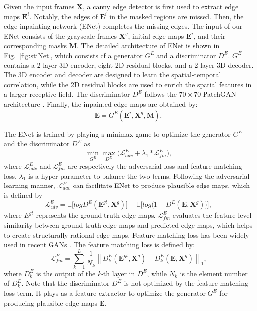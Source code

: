 Given the input frames $\boldsymbol{X}$, a canny edge detector is first used to extract edge maps $\boldsymbol{E}^{i}$. Notably, the edges of $\boldsymbol{E}^{i}$ in the masked regions are missed. 
Then, the edge inpainting network (ENet) completes the missing edges.
The input of our ENet consists of the grayscale frames $\boldsymbol{X}^{g}$, initial edge maps $\boldsymbol{E}^{i}$, and their corresponding masks $\boldsymbol{M}$.
%
The detailed architecture of ENet is shown in Fig.~\ref{fig:stiNet}, which consists of a generator $G^E$ and a discriminator $D^E$.
$G^E$ contains a 2-layer 3D encoder, eight 2D residual blocks, and a 2-layer 3D decoder. 
The 3D encoder and decoder are designed to learn the spatial-temporal correlation, while the 2D residual blocks are used to enrich the spatial features in a larger receptive field. The discriminator $D^E$ follows the $70\times 70$ PatchGAN architecture \cite{Isola_2017_CVPR}. 
Finally, the inpainted edge maps are obtained by:
\begin{equation}
\label{eq:edgenet}
\boldsymbol{E}=G^E(\boldsymbol{E}^{i},\boldsymbol{X}^{g},\boldsymbol{M}),
\end{equation}

The ENet is trained by playing a minimax game to optimize the generator $G^E$ and the discriminator $D^E$ as
\begin{equation}
\label{eq:loss_e}
\min\limits_{G^E} \max \limits_{D^E} \big(\mathcal{L}^E_{adv}+\lambda_1 * \mathcal{L}^E_{fm}\big),
\end{equation}
where $\mathcal{L}^E_{adv}$ and $\mathcal{L}^E_{fm}$ are respectively the adversarial loss and feature matching loss. 
$\lambda_1$ is a hyper-parameter to balance the two terms.
%
Following the adversarial learning manner, $\mathcal{L}^E_{adv}$ can facilitate ENet to produce plausible edge maps, which is defined by
\begin{equation} \label{eq:edge_adver}
\mathcal{L}^E_{adv}  =\mathbb{E}\big[logD^E(\boldsymbol{E}^{gt},\boldsymbol{X}^{g})\big] +\mathbb{E} \big[log\big(1-D^E ( \boldsymbol{E},\boldsymbol{X}^{g})\big)\big],
\end{equation}
where $E^{gt}$ represents the ground truth edge maps. $\mathcal{L}^E_{fm}$ evaluates the feature-level similarity between ground truth edge maps and predicted edge maps, which helps to create structurally rational edge maps. 
Feature matching loss has been widely used in recent GANs \cite{wang2018high}.
The feature matching loss is defined by:
\begin{equation}
\label{eq:edge_fm}
\mathcal{L}^E_{fm}=\sum_{k=1}^L{\frac{1}{N_k}\left\| D^E_k(\boldsymbol{E}^{gt},\boldsymbol{X}^{g})- D^E_k(\boldsymbol{E},\boldsymbol{X}^{g})\right\|_1},
\end{equation}
where $D^E_k$ is the output of the $k$-th layer in $D^E$, while $N_k$ is the element number of $D^E_k$. 
Note that the discriminator $D^E$ is not optimized by the feature matching loss term. It plays as a feature extractor to optimize the generator $G^E$ for producing plausible edge maps $\boldsymbol{E}$.



